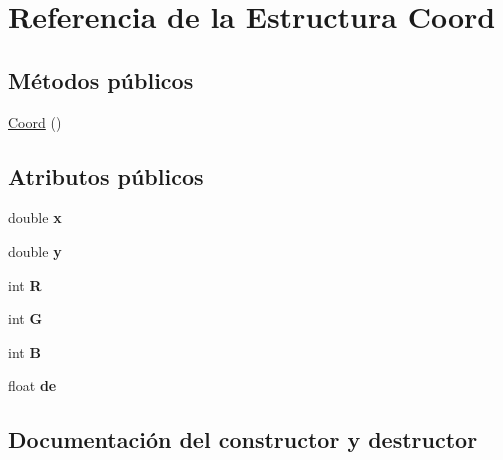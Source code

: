 \hypertarget{structCoord}{}\section{Referencia de la Estructura Coord}
\label{structCoord}
\subsection*{Métodos públicos}
\begin{DoxyCompactItemize}
\item 
\hyperlink{structCoord_add896c4f3fb15b4ad762b5270855345c}{Coord} ()
\end{DoxyCompactItemize}
\subsection*{Atributos públicos}
\begin{DoxyCompactItemize}
\item 
\mbox{\label{structCoord_a0172a22ee75843a96e3a84ebc25f3de7}} 
double {\bfseries x}
\item 
\mbox{\label{structCoord_af6e543e0522076e717bae53102655b87}} 
double {\bfseries y}
\item 
\mbox{\label{structCoord_a8ead39d3c60427e2d428a15bfbd9b4d7}} 
int {\bfseries R}
\item 
\mbox{\label{structCoord_ae23b32f330c7da521781e27f23341dae}} 
int {\bfseries G}
\item 
\mbox{\label{structCoord_a178fbef489d3631b6f7e68f421cfec37}} 
int {\bfseries B}
\item 
\mbox{\label{structCoord_a1f17c799bd8f733668e637dd706013d9}} 
float {\bfseries de}
\end{DoxyCompactItemize}


\subsection{Documentación del constructor y destructor}
\mbox{\label{structCoord_add896c4f3fb15b4ad762b5270855345c}} 
